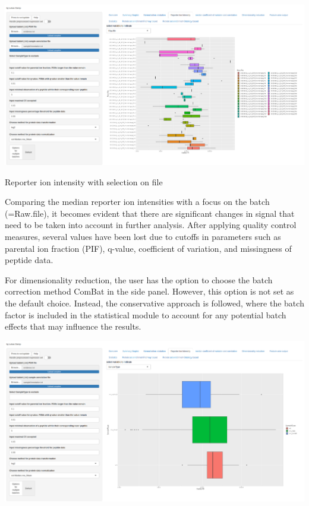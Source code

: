 \documentclass[
  11pt,
]{article}
\let\origfigure\figure
\begin{document}
\newpage
\bgroup  \origfigure[H] 

{\centering \includegraphics[width=1\linewidth]{screenshots/RI_file_default} 

}

\caption{Reporter ion intensity with selection on file}\label{fig:ui_RI_file_default}
 \endfigure\egroup

Comparing the median reporter ion intensities with a focus on the batch
(=Raw.file), it becomes evident that there are significant changes in
signal that need to be taken into account in further analysis. After
applying quality control measures, several values have been lost due to
cutoffs in parameters such as parental ion fraction (PIF), q-value,
coefficient of variation, and missingness of peptide data.

For dimensionality reduction, the user has the option to choose the
batch correction method ComBat \citep{Leek2012} in the side panel.
However, this option is not set as the default choice. Instead, the
conservative approach is followed, where the batch factor is included in
the statistical module to account for any potential batch effects that
may influence the results.

\newpage
\bgroup  \origfigure[H] 

{\centering \includegraphics[width=1\linewidth]{screenshots/RI_st_default} 

}
\end{document}
